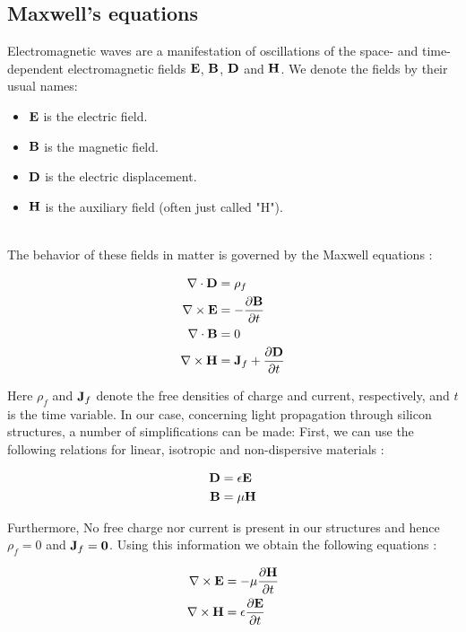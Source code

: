 \subsection{Maxwell's equations}

Electromagnetic waves are a manifestation of oscillations of the space- and time-dependent electromagnetic fields $\mathbf{E}$, $\mathbf{B}$, $\mathbf{D}$ and $\mathbf{H}$. We denote the fields by their usual names:
\begin{itemize}
\item[] $\mathbf{E}$ is the electric field.
\item[] $\mathbf{B}$ is the magnetic field.
\item[] $\mathbf{D}$ is the electric displacement.
\item[] $\mathbf{H}$ is the auxiliary field (often just called "H").
\end{itemize} 
\\
The behavior of these fields in matter is governed by the Maxwell equations \cite{Griffiths}: 

\begin{align}
\nabla \cdot \mathbf{D} &= \rho_f \\
\nabla \times \mathbf{E} &= -\dfrac{\partial \mathbf{B}}{\partial t} \\
\nabla \cdot \mathbf{B} & = 0 \\
\nabla \times \mathbf{H} &= \mathbf{J}_f + \dfrac{\partial \mathbf{D}}{\partial t}
\end{align}

Here $\rho_f$ and $\mathbf{J}_f$ denote the free densities of charge and current, respectively, and $t$ is the time variable. In our case, concerning light propagation through silicon structures, a number of simplifications can be made:
First, we can use the following relations for linear, isotropic and non-dispersive materials \cite{LirongYang}:

\begin{align}
\mathbf{D} &= \epsilon \mathbf{E} \\
\mathbf{B} &= \mu\mathbf{H} 
\end{align}

Furthermore, No free charge nor current is present in our structures and hence $\rho_f = 0$ and $\mathbf{J}_f = \mathbf{0}$. Using this information we obtain the following equations \cite{LarsPhD}:


\begin{align}
\nabla \times \mathbf{E} &= -\mu \dfrac{\partial \mathbf{H}}{\partial t} \label{Mxeq1}\\
\nabla \times \mathbf{H} &= \epsilon \dfrac{\partial \mathbf{E}}{\partial t} \label{Mxeq2}
\end{align}

